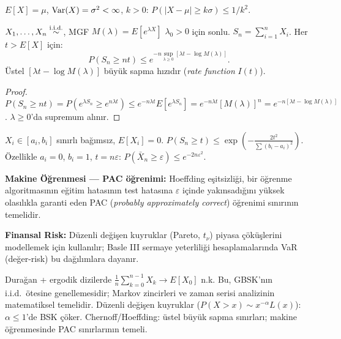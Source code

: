 \begin{teorem}\label{thm:chebyshev_hatirlatma}
$E[X]=\mu$, $\operatorname{Var}(X)=\sigma^2<\infty$, $k>0$:
$P(|X-\mu|\geq k\sigma)\leq 1/k^2$.
\end{teorem}

\begin{teorem}\label{thm:chernoff}
$X_1,\ldots,X_n\overset{\text{i.i.d.}}{\sim}$, MGF $M(\lambda)=E[e^{\lambda X}]$ $\lambda_0>0$ için sonlu. $S_n=\sum_{i=1}^n X_i$. Her $t>E[X]$ için:
\[
  P(S_n\geq nt) \leq e^{-n\sup_{\lambda\geq0}[\lambda t - \log M(\lambda)]}.
\]
Üstel $[\lambda t - \log M(\lambda)]$ büyük sapma hızıdır (\emph{rate function} $I(t)$).
\end{teorem}

\begin{proof}
$P(S_n\geq nt)=P(e^{\lambda S_n}\geq e^{n\lambda t})\leq e^{-n\lambda t}E[e^{\lambda S_n}]=e^{-n\lambda t}[M(\lambda)]^n=e^{-n[\lambda t-\log M(\lambda)]}$.
$\lambda\geq0$'da supremum alınır.
\end{proof}

\begin{ornek}\label{ex:hoeffding}
$X_i\in[a_i,b_i]$ sınırlı bağımsız, $E[X_i]=0$. $P(S_n\geq t)\leq\exp\!\left(-\frac{2t^2}{\sum(b_i-a_i)^2}\right)$.
Özellikle $a_i=0$, $b_i=1$, $t=n\varepsilon$: $P(\bar X_n\geq\varepsilon)\leq e^{-2n\varepsilon^2}$.
\end{ornek}

\begin{disiplinlerarasibaglan}
\textbf{Makine Öğrenmesi --- PAC öğrenimi:} Hoeffding eşitsizliği, bir öğrenme algoritmasının eğitim hatasının test hatasına $\varepsilon$ içinde yakınsadığını yüksek olasılıkla garanti eden PAC (\emph{probably approximately correct}) öğrenimi sınırının temelidir.

\textbf{Finansal Risk:} Düzenli değişen kuyruklar (Pareto, $t_\nu$) piyasa çöküşlerini modellemek için kullanılır; Basle III sermaye yeterliliği hesaplamalarında VaR (değer-risk) bu dağılımlara dayanır.
\end{disiplinlerarasibaglan}

\begin{mikroozet}
Durağan + ergodik dizilerde $\frac{1}{n}\sum_{k=0}^{n-1}X_k \to E[X_0]$ n.k.
Bu, GBSK'nın i.i.d.\ ötesine genellemesidir; Markov zincirleri ve zaman serisi
analizinin matematiksel temelidir.
Düzenli değişen kuyruklar ($P(X>x)\sim x^{-\alpha}L(x)$): $\alpha\leq1$'de BSK çöker.
Chernoff/Hoeffding: üstel büyük sapma sınırları; makine öğrenmesinde PAC sınırlarının temeli.
\end{mikroozet}

